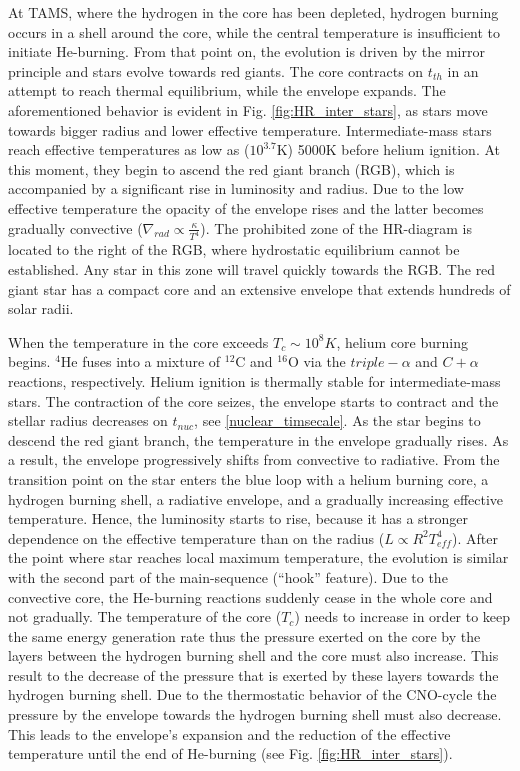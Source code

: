 At TAMS, where the hydrogen in the core has been depleted, hydrogen burning occurs in a shell around the core, while the central temperature is insufficient to initiate He-burning. From that point on, the evolution is driven by the mirror principle and stars evolve towards red giants. The core contracts on $t_{th}$ in an attempt to reach thermal equilibrium, while the envelope expands. The aforementioned behavior is evident in Fig. \ref{fig:HR_inter_stars}, as stars move towards bigger radius and lower effective temperature. Intermediate-mass stars reach effective temperatures as low as ($10^{3.7}$K) 5000K before helium ignition. At this moment, they begin to ascend the red giant branch (RGB), which is accompanied by a significant rise in luminosity and radius. Due to the low effective temperature the opacity of the envelope rises and the latter becomes gradually convective ($\nabla_{rad} \propto \frac{\kappa}{T^4}$). The prohibited zone of the HR-diagram is located to the right of the RGB, where hydrostatic equilibrium cannot be established. Any star in this zone will travel quickly towards the RGB. The red giant star has a compact core and an extensive envelope that extends hundreds of solar radii. 

When the temperature in the core exceeds $T_c \sim 10^8 K$, helium core burning begins. $^4$He fuses into a mixture of $^{12}$C and $^{16
}$O via the $triple- \alpha$ and $C+\alpha$ reactions, respectively. Helium ignition is thermally stable for intermediate-mass stars. The contraction of the core seizes, the envelope starts to contract and the stellar radius decreases on $t_{nuc}$, see \eqref{nuclear_timsecale}. As the star begins to descend the red giant branch, the temperature in the envelope gradually rises. As a result, the envelope progressively shifts from convective to radiative. From the transition point on the star enters the blue loop with a helium burning core, a hydrogen burning shell, a radiative envelope, and a gradually increasing effective temperature.  Hence, the luminosity starts to rise, because it has a stronger dependence on the effective temperature than on the radius ($L \propto R^2 T_{eff}^4$). After the point where star reaches local maximum temperature, the evolution is similar with the second part of the main-sequence (``hook'' feature). Due to the convective core, the He-burning reactions suddenly cease in the whole core and not gradually. The temperature of the core ($T_c$) needs to increase in order to keep the same energy generation rate thus the pressure exerted on the core by the layers between the hydrogen burning shell and the core must also increase. This result to the decrease of the pressure that is exerted by these layers towards the hydrogen burning shell. Due to the thermostatic behavior of the CNO-cycle the pressure by the envelope towards the hydrogen burning shell must also decrease. This leads to the envelope's expansion and the reduction of the effective temperature until the end of He-burning (see Fig. \ref{fig:HR_inter_stars}).

